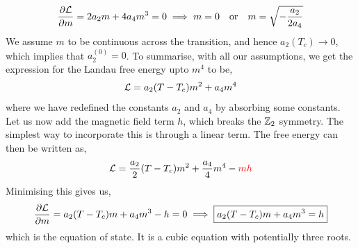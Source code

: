 \begin{align}
    \pdv{\mathcal L}{m} = 2a_2 m +4a_4m^3 = 0 \implies  m =0 \quad \text{or} \quad m = \sqrt{-\frac{a_2}{2a_4}}
\end{align}
We assume $m$ to be continuous across the transition, and hence $a_2(T_c)\to 0$, which implies that $a_2^{(0)}=0$. To summarise, with all our assumptions, we get the expression for the Landau free energy upto $m^4$ to be,
\begin{equation}
    \mathcal L = a_2 (T-T_c)m^2 + a_4m^4 
\end{equation}
where we have redefined the constants $a_2$ and $a_4$ by absorbing some constants. Let us now add the magnetic field term $h$, which breaks the $\mathbb{Z}_2$ symmetry. The simplest way to incorporate this is through a linear term. The free energy can then be written as,
\begin{equation}
    \SL = \frac{a_2}{2}(T-T_c)m^2 + \frac{a_4}{4}m^4 - \mathcolor{red}{mh}
\end{equation}
Minimising this gives us,
\begin{align*}
    \pdv{\mathcal L}{m} = a_2(T-T_c)m +a_4m^3 -h = 0 \implies \boxed{a_2(T-T_c)m +a_4m^3=h}
\end{align*}
which is the equation of state. It is a cubic equation with potentially three roots.
